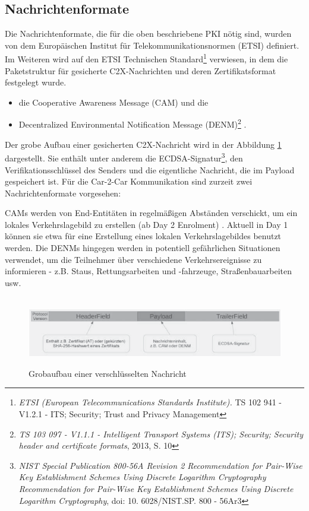 \subsection{Nachrichtenformate}
\label{sec:FirstContentSection:SecondSubSection}

Die Nachrichtenformate, die für die oben beschriebene PKI nötig sind, wurden von dem Europäischen Institut für Telekommunikationsnormen (ETSI) definiert. Im Weiteren wird auf den ETSI Technischen Standard\footnote{\emph{ETSI (European Telecommunications Standards Institute).} TS 102 941 - V1.2.1 - ITS; Security; Trust and Privacy Management}\nocite{ETSI2018} verwiesen, in dem die Paketstruktur für gesicherte C2X-Nachrichten und deren Zertifikatsformat festgelegt wurde. 

\begin{itemize}
	\item die Cooperative Awareness Message (CAM) und die 
	\item Decentralized Environmental Notification Message (DENM)\footnote{\emph{TS 103 097 - V1.1.1 - Intelligent Transport Systems (ITS); Security; Security header and certificate formats}, 2013, S. 10} \nocite{ETSI2013}.
\end{itemize}

Der grobe Aufbau einer gesicherten C2X-Nachricht wird in der Abbildung \ref{fig:nachrichtenaufbau} dargestellt. Sie enthält unter anderem die ECDSA-Signatur\footnote{\emph{NIST Special Publication 800-56A Revision 2 Recommendation for Pair-Wise Key Establishment Schemes Using Discrete Logarithm Cryptography Recommendation for Pair-Wise Key Establishment Schemes Using Discrete Logarithm Cryptography}, doi: 10. 6028/NIST.SP. 800 - 56Ar3}\nocite{Barker2013}, den Verifikationsschlüssel des Senders und die eigentliche Nachricht, die im Payload gespeichert ist. Für die Car-2-Car Kommunikation sind zurzeit zwei Nachrichtenformate vorgesehen:

CAMs werden von End-Entitäten in regelmäßigen Abständen verschickt, um ein lokales Verkehrslagebild zu erstellen (ab Day 2 Enrolment) . Aktuell in Day 1 können sie etwa für eine Erstellung eines lokalen Verkehrslagebildes benutzt werden. Die DENMs hingegen werden in potentiell gefährlichen Situationen verwendet, um die Teilnehmer über verschiedene Verkehrsereignisse zu informieren - z.B. Staus, Rettungsarbeiten und -fahrzeuge, Straßenbauarbeiten usw. 

\begin{figure}
	\centering
 	\includegraphics[width=0.7\linewidth]{images/Nachrichtenaufbau}
	\caption[Grobaufbau einer verschlüsselten Nachricht]{Grobaufbau einer verschlüsselten Nachricht \footnotemark}
	\label{fig:nachrichtenaufbau}
\end{figure}

